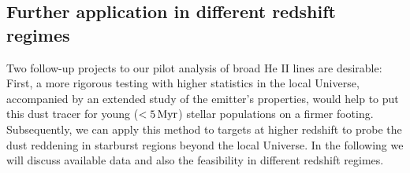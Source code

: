 \documentclass[linenumbers]{aastex63}
\begin{document}

\subsection{Further application in different redshift regimes}
Two follow-up projects to our pilot analysis of broad He II lines are desirable: 
First, a more rigorous testing with higher statistics in the local Universe, accompanied by an extended study of the emitter's properties, would help to put this dust tracer for young ($<5\,{\rm Myr}$) stellar populations on a firmer footing. Subsequently, we can apply this method to targets at higher redshift to probe the dust reddening in starburst regions beyond the local Universe.  
In the following we will discuss available data and also the feasibility in different redshift regimes.
\end{document}
